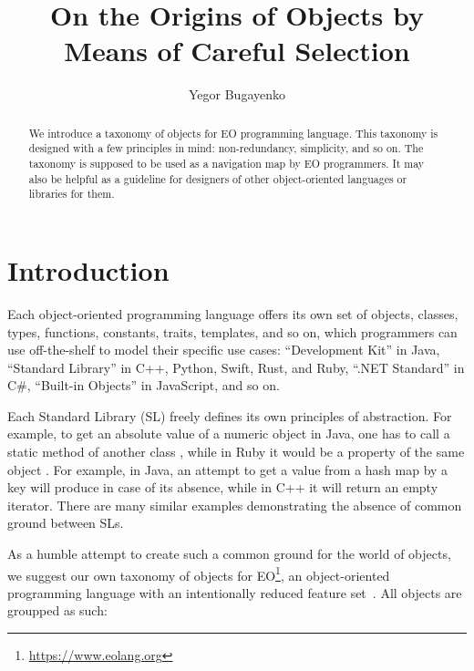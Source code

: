 \documentclass[sigplan,review,11pt,nonacm,natbib=false]{acmart}
\title{On the Origins of Objects by Means of Careful Selection}
\author{Yegor Bugayenko}
\affiliation{Huawei\city{Moscow}\country{Russia}}
\begin{document}
\raggedbottom

\begin{abstract}
We introduce a taxonomy of objects for EO programming language. This taxonomy is designed with a few principles in mind: non-redundancy, simplicity, and so on. The taxonomy is supposed to be used as a navigation map by EO programmers. It may also be helpful as a guideline for designers of other object-oriented languages or libraries for them.
\end{abstract}

\maketitle

\section{Introduction}

Each object-oriented programming language offers its own set of objects, classes, types, functions, constants, traits, templates, and so on, which programmers can use off-the-shelf to model their specific use cases:
``Development Kit'' in Java,
``Standard Library'' in C++, Python, Swift, Rust, and Ruby,
``.NET Standard'' in C\#,
``Built-in Objects'' in JavaScript,
and so on.

Each Standard Library (SL) freely defines its own principles of abstraction. For example, to get an absolute value of a numeric object  in Java, one has to call a static method of another class , while in Ruby it would be a property of the same object . For example, in Java, an attempt to get a value from a hash map by a key will produce  in case of its absence, while in C++ it will return an empty iterator. There are many similar examples demonstrating the absence of common ground between SLs.

As a humble attempt to create such a common ground for the world of objects, we suggest our own taxonomy of objects for EO\footnote{\url{https://www.eolang.org}}, an object-oriented programming language with an intentionally reduced feature set~\citep{bugayenko2021eolang}. All objects are groupped as such:
\end{document}
